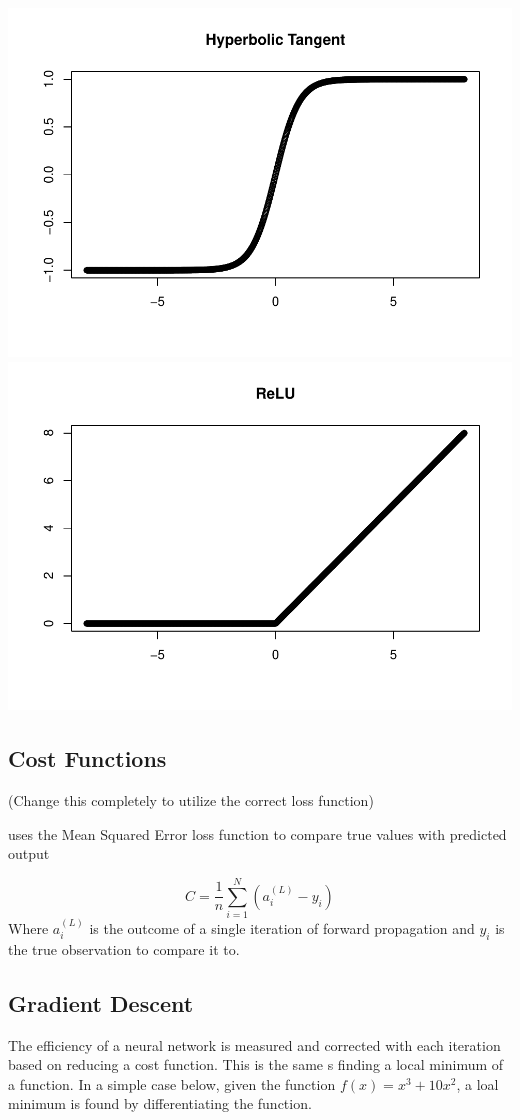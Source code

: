 \documentclass[
]{article}
\begin{document}
\includegraphics[width=0.5\linewidth]{ANN_files/figures-side-1}
\includegraphics[width=0.5\linewidth]{ANN_files/figures-side-2}

\hypertarget{cost-functions}{%
\subsection{Cost Functions}\label{cost-functions}}

(Change this completely to utilize the correct loss function)

uses the Mean Squared Error loss function to compare true values with
predicted output

\[
C = \frac{1}{n} \sum_{i=1}^N (a^{(L)}_i - y_i)
\] Where \(a^{(L)}_i\) is the outcome of a single iteration of forward
propagation and \(y_i\) is the true observation to compare it to.

\hypertarget{gradient-descent}{%
\subsection{Gradient Descent}\label{gradient-descent}}

The efficiency of a neural network is measured and corrected with each
iteration based on reducing a cost function. This is the same s finding
a local minimum of a function. In a simple case below, given the
function \(f(x) = x^3 + 10x^2\), a loal minimum is found by
differentiating the function.
\end{document}
